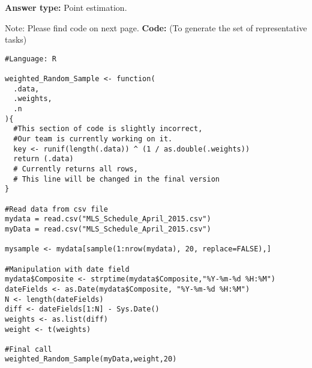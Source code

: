 \documentclass[12pt]{article}
\begin{document}
\begin{flushleft}
\textbf{Answer type:} Point estimation.	\par

Note: Please find code on next page.
\clearpage
\textbf{Code:} (To generate the set of representative tasks)
\lstset{language=R}
\begin{lstlisting}[frame=single]  
#Language: R

weighted_Random_Sample <- function(
  .data,
  .weights,
  .n
){
  #This section of code is slightly incorrect, 
  #Our team is currently working on it.
  key <- runif(length(.data)) ^ (1 / as.double(.weights))
  return (.data) 
  # Currently returns all rows, 
  # This line will be changed in the final version
}

#Read data from csv file
mydata = read.csv("MLS_Schedule_April_2015.csv")
myData = read.csv("MLS_Schedule_April_2015.csv")

mysample <- mydata[sample(1:nrow(mydata), 20, replace=FALSE),] 

#Manipulation with date field
mydata$Composite <- strptime(mydata$Composite,"%Y-%m-%d %H:%M")
dateFields <- as.Date(mydata$Composite, "%Y-%m-%d %H:%M")
N <- length(dateFields)
diff <- dateFields[1:N] - Sys.Date()
weights <- as.list(diff)
weight <- t(weights)

#Final call
weighted_Random_Sample(myData,weight,20)

\end{lstlisting}

\end{flushleft}
\end{document}
